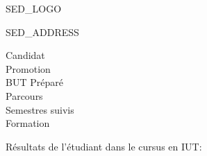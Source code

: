 \documentclass{article}
\begin{document}
\begin{minipage}[T]{0.51\textwidth}
    SED_LOGO
    \vfill
\end{minipage}%
\hfill
\vline
\hfill
\begin{minipage}[T]{0.45\textwidth}
    \raggedleft
    SED_ADDRESS
\end{minipage}

\vspace{1em}
\begin{center}
\end{center}
\vspace{0.5em}
\begin{center}
    \begin{description}
        \item[Candidat] \candidat
        \item[Promotion] \promotion
        \item[BUT Préparé] \but
        \item[Parcours] \parcours
        \item[Semestres suivis] \semestres
        \item[Formation] \alternant
    \end{description}
\end{center}
\vspace{1em}
\noindent Résultats de l'étudiant dans le cursus en IUT:
\end{document}

